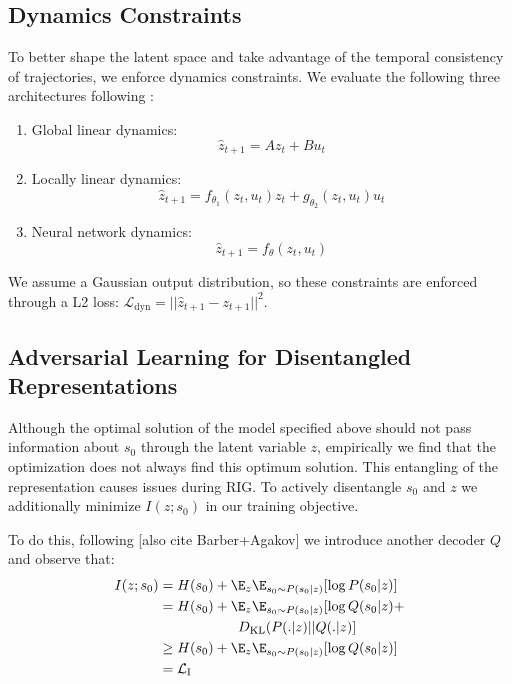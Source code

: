 
\subsection{Dynamics Constraints }
To better shape the latent space and take advantage of the temporal consistency of trajectories, we enforce dynamics constraints. We evaluate the following three architectures following \cite{watter2015embed}:
\begin{enumerate}
    \item Global linear dynamics:
        $$\hat{z}_{t+1} = A z_t + B u_t$$
    \item Locally linear dynamics:
        $$\hat{z}_{t+1} = f_{\theta_1}(z_t, u_t) z_t + g_{\theta_2}(z_t, u_t) u_t$$
    \item Neural network dynamics:
        $$\hat{z}_{t+1} = f_\theta(z_t, u_t)$$
\end{enumerate}
We assume a Gaussian output distribution, so these constraints are enforced through a L2 loss: $\mathcal L_\text{dyn} = ||\hat{z}_{t+1} - z_{t+1}||^2$. 



\subsection{Adversarial Learning for Disentangled Representations }

Although the optimal solution of the model specified above should not pass information about $s_0$ through the latent variable $z$, empirically we find that the optimization does not always find this optimum solution. This entangling of the representation causes issues during RIG. To actively disentangle $s_0$ and $z$ we additionally minimize $I(z; s_0)$ in our training objective.

To do this, following [also cite Barber+Agakov] \cite{chen2016infogan} we introduce another decoder $Q$ and observe that:
\begin{align}
    I(z; s_0) &= H(s_0) + \E_{z} \E_{s_0 \sim P(s_0|z)} [\log P(s_0|z)] \\
    &= H(s_0) + \E_{z} \E_{s_0 \sim P(s_0|z)} [\log Q(s_0|z) +  \\ & \hspace{2cm} D_\text{KL}( P(.|z) || Q(.|z) ] \\
    &\geq H(s_0) + \E_{z} \E_{s_0 \sim P(s_0|z)} [\log Q(s_0|z)] \\ 
    &= \mathcal L_\text{I}
\end{align}

